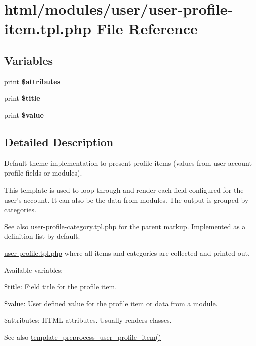 \hypertarget{user-profile-item_8tpl_8php}{
\section{html/modules/user/user-\/profile-\/item.tpl.php File Reference}
\label{user-profile-item_8tpl_8php}
}
\subsection*{Variables}
\begin{DoxyCompactItemize}
\item 
\hypertarget{user-profile-item_8tpl_8php_a9c88c4272fa40546577b45392a0b3cd3}{
print {\bfseries \$attributes}}
\label{user-profile-item_8tpl_8php_a9c88c4272fa40546577b45392a0b3cd3}

\item 
\hypertarget{user-profile-item_8tpl_8php_aec2795512d255332f57cacd930a090b4}{
print {\bfseries \$title}}
\label{user-profile-item_8tpl_8php_aec2795512d255332f57cacd930a090b4}

\item 
\hypertarget{user-profile-item_8tpl_8php_aa63ba310044cc87231df10757a908a52}{
print {\bfseries \$value}}
\label{user-profile-item_8tpl_8php_aa63ba310044cc87231df10757a908a52}

\end{DoxyCompactItemize}


\subsection{Detailed Description}
Default theme implementation to present profile items (values from user account profile fields or modules).

This template is used to loop through and render each field configured for the user's account. It can also be the data from modules. The output is grouped by categories.

\begin{DoxySeeAlso}{See also}
\hyperlink{user-profile-category_8tpl_8php}{user-\/profile-\/category.tpl.php} for the parent markup. Implemented as a definition list by default. 

\hyperlink{user-profile_8tpl_8php}{user-\/profile.tpl.php} where all items and categories are collected and printed out.
\end{DoxySeeAlso}
Available variables:
\begin{DoxyItemize}
\item \$title: Field title for the profile item.
\item \$value: User defined value for the profile item or data from a module.
\item \$attributes: HTML attributes. Usually renders classes.
\end{DoxyItemize}

\begin{DoxySeeAlso}{See also}
\hyperlink{user_8pages_8inc_ab6e6ed16b5647c626cc0468506abd3e9}{template\_\-preprocess\_\-user\_\-profile\_\-item()} 
\end{DoxySeeAlso}
